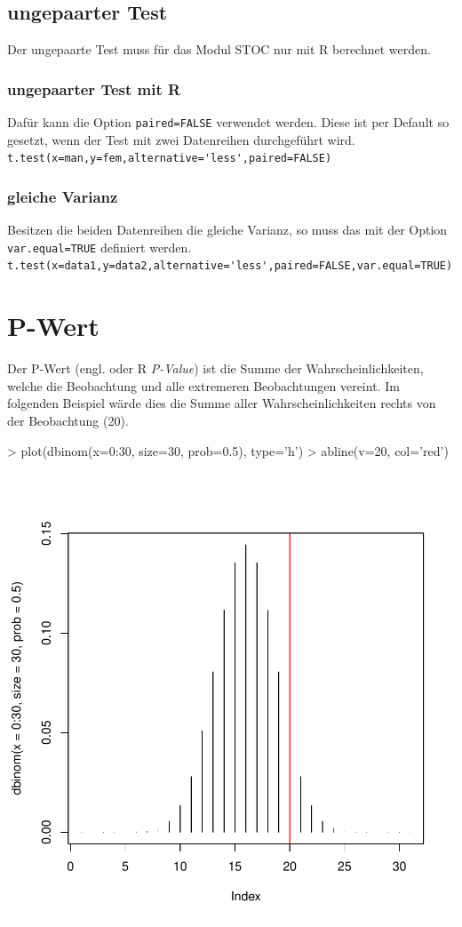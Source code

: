 \subsection{ungepaarter Test}
Der ungepaarte Test muss für das Modul STOC nur mit R berechnet werden. 

\subsubsection{ungepaarter Test mit R}
Dafür kann die Option \verb!paired=FALSE! verwendet werden. Diese ist per 
Default so gesetzt, wenn der Test mit zwei Datenreihen durchgeführt wird. \\
\verb!t.test(x=man,y=fem,alternative='less',paired=FALSE)!\\

\subsubsection{gleiche Varianz}
Besitzen die beiden Datenreihen die gleiche Varianz, so muss das mit der Option 
\verb!var.equal=TRUE! definiert werden. \\
\verb!t.test(x=data1,y=data2,alternative='less',paired=FALSE,var.equal=TRUE)!

\section{P-Wert}
Der P-Wert (engl. oder R \emph{P-Value}) ist die Summe der 
Wahrscheinlichkeiten, welche die Beobachtung
und alle extremeren Beobachtungen vereint. Im folgenden Beispiel wärde dies
die Summe aller Wahrscheinlichkeiten rechts von der Beobachtung (20).

\begin{Schunk}
\begin{Sinput}
> plot(dbinom(x=0:30, size=30, prob=0.5), type='h')
> abline(v=20, col='red')
\end{Sinput}
\end{Schunk}
\includegraphics{definitionen-028}

